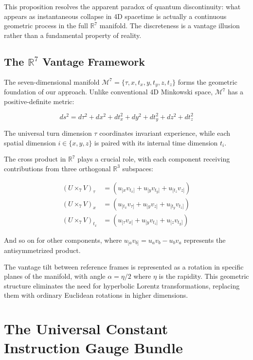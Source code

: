 \documentclass{article}
\begin{document}
This proposition resolves the apparent paradox of quantum discontinuity: what appears as instantaneous collapse in 4D spacetime is actually a continuous geometric process in the full $\mathbb{R}^7$ manifold. The discreteness is a vantage illusion rather than a fundamental property of reality.

\subsection{The $\mathbb{R}^7$ Vantage Framework}

The seven-dimensional manifold $\mathcal{M}^7 = \{\tau, x, t_x, y, t_y, z, t_z\}$ forms the geometric foundation of our approach. Unlike conventional 4D Minkowski space, $\mathcal{M}^7$ has a positive-definite metric:

\begin{equation}
ds^2 = d\tau^2 + dx^2 + dt_x^2 + dy^2 + dt_y^2 + dz^2 + dt_z^2
\end{equation}

The universal turn dimension $\tau$ coordinates invariant experience, while each spatial dimension $i \in \{x, y, z\}$ is paired with its internal time dimension $t_i$.

The cross product in $\mathbb{R}^7$ plays a crucial role, with each component receiving contributions from three orthogonal $\mathbb{R}^3$ subspaces:

\begin{align}
(U \times_7 V)_\tau &= (u_{[x}v_{t_x]} + u_{[y}v_{t_y]} + u_{[t_z}v_{z]})\\
(U \times_7 V)_x &= (u_{[t_x}v_{\tau]} + u_{[y}v_{z]} + u_{[t_y}v_{t_z]})\\
(U \times_7 V)_{t_x} &= (u_{[\tau}v_{x]} + u_{[y}v_{t_z]} + u_{[z}v_{t_y]})
\end{align}

And so on for other components, where $u_{[a}v_{b]} = u_a v_b - u_b v_a$ represents the antisymmetrized product.

The vantage tilt between reference frames is represented as a rotation in specific planes of the manifold, with angle $\alpha = \eta/2$ where $\eta$ is the rapidity. This geometric structure eliminates the need for hyperbolic Lorentz transformations, replacing them with ordinary Euclidean rotations in higher dimensions.

\section{The Universal Constant Instruction Gauge Bundle}
\end{document}
